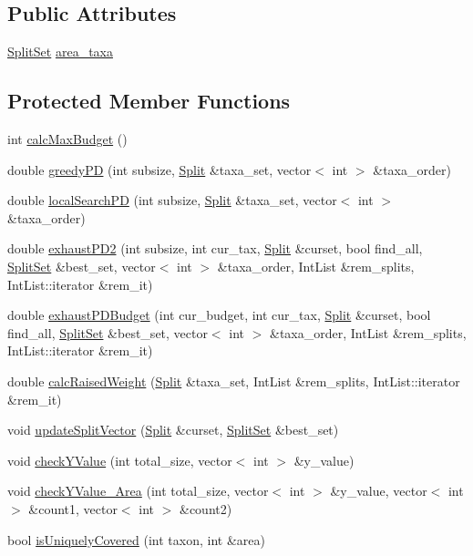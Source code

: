 \subsection*{Public Attributes}
\begin{DoxyCompactItemize}
\item 
\hyperlink{classSplitSet}{SplitSet} \hyperlink{classPDNetwork_a74a7b822f5483c3a6e2e6bbdc98ef1a3}{area\_\-taxa}
\end{DoxyCompactItemize}
\subsection*{Protected Member Functions}
\begin{DoxyCompactItemize}
\item 
int \hyperlink{classPDNetwork_af8e34bc2e3a369335ef9c7499a2712ea}{calcMaxBudget} ()
\item 
double \hyperlink{classPDNetwork_a45e8597bb2a7f8829b2560c613a10497}{greedyPD} (int subsize, \hyperlink{classSplit}{Split} \&taxa\_\-set, vector$<$ int $>$ \&taxa\_\-order)
\item 
double \hyperlink{classPDNetwork_afad7cba535aee59bb8b96542cb195e35}{localSearchPD} (int subsize, \hyperlink{classSplit}{Split} \&taxa\_\-set, vector$<$ int $>$ \&taxa\_\-order)
\item 
double \hyperlink{classPDNetwork_ac61874535f7ab2a49611444ca53b93cd}{exhaustPD2} (int subsize, int cur\_\-tax, \hyperlink{classSplit}{Split} \&curset, bool find\_\-all, \hyperlink{classSplitSet}{SplitSet} \&best\_\-set, vector$<$ int $>$ \&taxa\_\-order, IntList \&rem\_\-splits, IntList::iterator \&rem\_\-it)
\item 
double \hyperlink{classPDNetwork_a05d495099dac5a851aa057c05bd5f780}{exhaustPDBudget} (int cur\_\-budget, int cur\_\-tax, \hyperlink{classSplit}{Split} \&curset, bool find\_\-all, \hyperlink{classSplitSet}{SplitSet} \&best\_\-set, vector$<$ int $>$ \&taxa\_\-order, IntList \&rem\_\-splits, IntList::iterator \&rem\_\-it)
\item 
double \hyperlink{classPDNetwork_adbdf5778b7d6b1468d9a32c831d0f951}{calcRaisedWeight} (\hyperlink{classSplit}{Split} \&taxa\_\-set, IntList \&rem\_\-splits, IntList::iterator \&rem\_\-it)
\item 
void \hyperlink{classPDNetwork_a684fdd0cfd902a037bb8ce0bb6846a43}{updateSplitVector} (\hyperlink{classSplit}{Split} \&curset, \hyperlink{classSplitSet}{SplitSet} \&best\_\-set)
\item 
void \hyperlink{classPDNetwork_a1e9909731a5f229897392d802ef69a60}{checkYValue} (int total\_\-size, vector$<$ int $>$ \&y\_\-value)
\item 
void \hyperlink{classPDNetwork_a438360816421d31dc8902323ce57a497}{checkYValue\_\-Area} (int total\_\-size, vector$<$ int $>$ \&y\_\-value, vector$<$ int $>$ \&count1, vector$<$ int $>$ \&count2)
\item 
bool \hyperlink{classPDNetwork_a89a41e4b180dacd776a0496cb4137080}{isUniquelyCovered} (int taxon, int \&area)
\end{DoxyCompactItemize}
